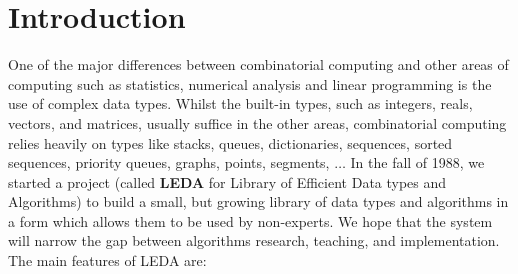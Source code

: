 \chapter{Introduction} \label{Introduction}

One of the major differences between combinatorial computing
and other areas of computing such as statistics, numerical
analysis and linear programming is the use of complex data types. 
Whilst the built-in types, such as integers, reals, vectors, and matrices,
usually suffice in the other areas, combinatorial computing relies heavily 
on types like stacks, queues, dictionaries, sequences, sorted sequences, 
priority queues, graphs, points, segments, $\ldots$
In the fall of 1988, we started a project (called {\bf LEDA} for Library of
Efficient Data types and Algorithms) to build a small, but growing library 
of data types and algorithms in a form which allows them to be used by 
non-experts. We hope that the system will narrow the gap between algorithms
research, teaching, and implementation. The main features of LEDA are:

